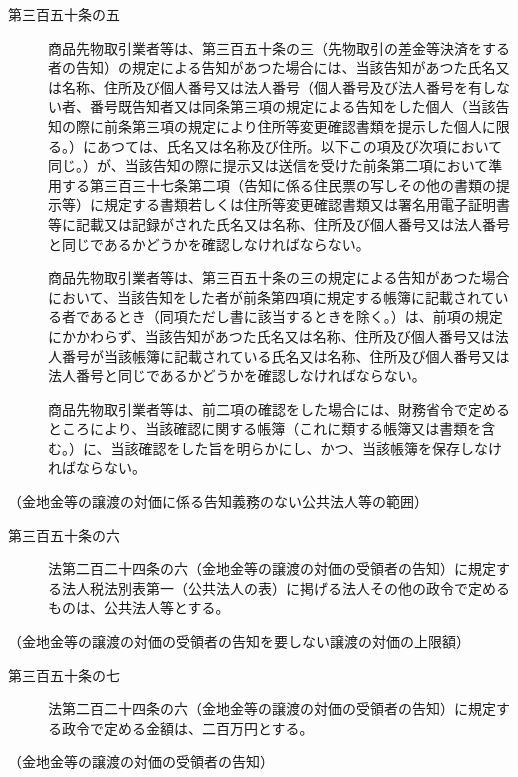 \documentclass[twocolumn,a4j,10pt]{ltjtarticle}
\begin{document}
\begin{description}
\item[第三百五十条の五]商品先物取引業者等は、第三百五十条の三（先物取引の差金等決済をする者の告知）の規定による告知があつた場合には、当該告知があつた氏名又は名称、住所及び個人番号又は法人番号（個人番号及び法人番号を有しない者、番号既告知者又は同条第三項の規定による告知をした個人（当該告知の際に前条第三項の規定により住所等変更確認書類を提示した個人に限る。）にあつては、氏名又は名称及び住所。以下この項及び次項において同じ。）が、当該告知の際に提示又は送信を受けた前条第二項において準用する第三百三十七条第二項（告知に係る住民票の写しその他の書類の提示等）に規定する書類若しくは住所等変更確認書類又は署名用電子証明書等に記載又は記録がされた氏名又は名称、住所及び個人番号又は法人番号と同じであるかどうかを確認しなければならない。
\item[]商品先物取引業者等は、第三百五十条の三の規定による告知があつた場合において、当該告知をした者が前条第四項に規定する帳簿に記載されている者であるとき（同項ただし書に該当するときを除く。）は、前項の規定にかかわらず、当該告知があつた氏名又は名称、住所及び個人番号又は法人番号が当該帳簿に記載されている氏名又は名称、住所及び個人番号又は法人番号と同じであるかどうかを確認しなければならない。
\item[]商品先物取引業者等は、前二項の確認をした場合には、財務省令で定めるところにより、当該確認に関する帳簿（これに類する帳簿又は書類を含む。）に、当該確認をした旨を明らかにし、かつ、当該帳簿を保存しなければならない。
\end{description}
\noindent\hspace{10pt}（金地金等の譲渡の対価に係る告知義務のない公共法人等の範囲）
\begin{description}
\item[第三百五十条の六]法第二百二十四条の六（金地金等の譲渡の対価の受領者の告知）に規定する法人税法別表第一（公共法人の表）に掲げる法人その他の政令で定めるものは、公共法人等とする。
\end{description}
\noindent\hspace{10pt}（金地金等の譲渡の対価の受領者の告知を要しない譲渡の対価の上限額）
\begin{description}
\item[第三百五十条の七]法第二百二十四条の六（金地金等の譲渡の対価の受領者の告知）に規定する政令で定める金額は、二百万円とする。
\end{description}
\noindent\hspace{10pt}（金地金等の譲渡の対価の受領者の告知）
\end{document}
